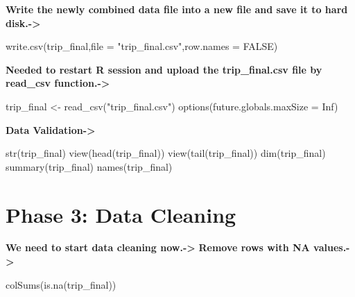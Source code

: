 \documentclass[
]{article}
\newenvironment{Shaded}{\begin{snugshade}}{\end{snugshade}}
\newcommand{\AttributeTok}[1]{\textcolor[rgb]{0.77,0.63,0.00}{#1}}
\newcommand{\ConstantTok}[1]{\textcolor[rgb]{0.00,0.00,0.00}{#1}}
\newcommand{\FunctionTok}[1]{\textcolor[rgb]{0.00,0.00,0.00}{#1}}
\newcommand{\NormalTok}[1]{#1}
\newcommand{\OtherTok}[1]{\textcolor[rgb]{0.56,0.35,0.01}{#1}}
\newcommand{\StringTok}[1]{\textcolor[rgb]{0.31,0.60,0.02}{#1}}
\begin{document}
\textbf{Write the newly combined data file into a new file and save it
to hard disk.-\textgreater{}}

\begin{Shaded}
\begin{Highlighting}[]
\FunctionTok{write.csv}\NormalTok{(trip\_final,}\AttributeTok{file =} \StringTok{"trip\_final.csv"}\NormalTok{,}\AttributeTok{row.names =} \ConstantTok{FALSE}\NormalTok{)}
\end{Highlighting}
\end{Shaded}

\textbf{Needed to restart R session and upload the trip\_final.csv file
by read\_csv function.-\textgreater{}}

\begin{Shaded}
\begin{Highlighting}[]
\NormalTok{trip\_final }\OtherTok{\textless{}{-}} \FunctionTok{read\_csv}\NormalTok{(}\StringTok{"trip\_final.csv"}\NormalTok{)}
\FunctionTok{options}\NormalTok{(}\AttributeTok{future.globals.maxSize =} \ConstantTok{Inf}\NormalTok{)}
\end{Highlighting}
\end{Shaded}

\textbf{Data Validation-\textgreater{}}

\begin{Shaded}
\begin{Highlighting}[]
\FunctionTok{str}\NormalTok{(trip\_final)}
\FunctionTok{view}\NormalTok{(}\FunctionTok{head}\NormalTok{(trip\_final))}
\FunctionTok{view}\NormalTok{(}\FunctionTok{tail}\NormalTok{(trip\_final))}
\FunctionTok{dim}\NormalTok{(trip\_final)}
\FunctionTok{summary}\NormalTok{(trip\_final)}
\FunctionTok{names}\NormalTok{(trip\_final)}
\end{Highlighting}
\end{Shaded}

\hypertarget{phase-3-data-cleaning}{%
\section{\texorpdfstring{\textbf{Phase 3: Data
Cleaning}}{Phase 3: Data Cleaning}}\label{phase-3-data-cleaning}}

\textbf{We need to start data cleaning now.-\textgreater{}}
\textbf{Remove rows with NA values.-\textgreater{}}

\begin{Shaded}
\begin{Highlighting}[]
\FunctionTok{colSums}\NormalTok{(}\FunctionTok{is.na}\NormalTok{(trip\_final))}
\end{Highlighting}
\end{Shaded}
\end{document}
